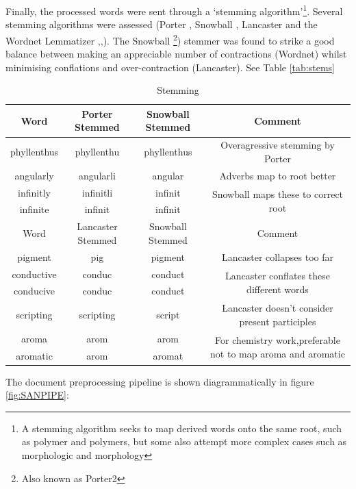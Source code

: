 Finally, the processed words were sent through a `stemming algorithm'\footnote{A stemming algorithm seeks to map derived words onto the same root, such as polymer and polymers, but some also attempt more complex cases such as morphologic and morphology}. Several stemming algorithms were assessed (Porter \cite{porter}, Snowball \cite{snowball}\cite{nltk}, Lancaster \cite{lancaster} and the Wordnet Lemmatizer \cite{wordnet1},\cite{wordnet2},\cite{wordnet3}). The Snowball \footnote{Also known as Porter2}) stemmer was found to strike a good balance between making an appreciable number of contractions (Wordnet) whilst minimising conflations and over-contraction (Lancaster). See Table \ref{tab:stems}
\begin{table}[h!]
\begin{center}
\caption{Stemming}
\begin{tabular}{||c|c|c|c||}
\hline
Word & Porter Stemmed & Snowball Stemmed & Comment\\
\hline     
phyllenthus & phyllenthu & phyllenthus & Overagressive stemming by Porter\\
\hline
angularly & angularli & angular & Adverbs map to root better\\
\hline
infinitly & infinitli & infinit & \multirow{2}{*}{Snowball maps these to correct root}\\
\cline{1-3}
infinite & infinit & infinit&\\
\hline
\hline
Word & Lancaster Stemmed & Snowball Stemmed & Comment\\
\hline
pigment & pig & pigment & Lancaster collapses too far\\
\hline
conductive & conduc & conduct & \multirow{2}{*}{Lancaster conflates these different words}\\
\cline{1-3}
conducive & conduc & conduct & \\
\hline
scripting & scripting & script & Lancaster doesn't consider present participles\\
\hline
aroma & arom & arom & \multirow{2}{*}{For chemistry work,preferable not to map aroma and aromatic}\\
\cline{1-3}
aromatic & arom & aromat & \\
\hline
\end{tabular}
\end{center}
\end{table}
The document preprocessing pipeline is shown diagrammatically in figure \ref{fig:SANPIPE}:

